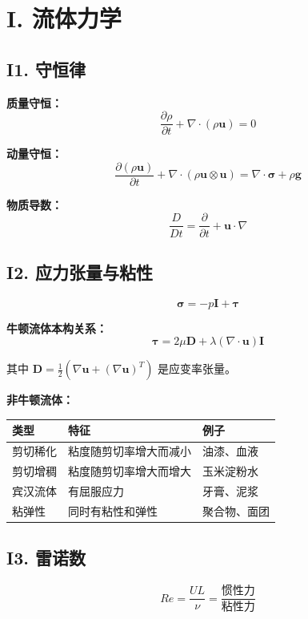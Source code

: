 \section{I. 流体力学}

\subsection{I1. 守恒律}

\textbf{质量守恒：}
\[
\frac{\partial \rho}{\partial t} + \nabla \cdot (\rho \mathbf{u}) = 0
\]

\textbf{动量守恒：}
\[
\frac{\partial(\rho \mathbf{u})}{\partial t} + \nabla \cdot (\rho \mathbf{u} \otimes \mathbf{u}) = \nabla \cdot \boldsymbol{\sigma} + \rho \mathbf{g}
\]

\textbf{物质导数：}
\[
\frac{D}{Dt} = \frac{\partial}{\partial t} + \mathbf{u} \cdot \nabla
\]

\subsection{I2. 应力张量与粘性}

\[
\boldsymbol{\sigma} = -p\mathbf{I} + \boldsymbol{\tau}
\]

\textbf{牛顿流体本构关系：}
\[
\boldsymbol{\tau} = 2\mu\mathbf{D} + \lambda(\nabla\cdot\mathbf{u})\mathbf{I}
\]

其中 $\mathbf{D} = \frac{1}{2}(\nabla\mathbf{u} + (\nabla\mathbf{u})^T)$ 是应变率张量。

\textbf{非牛顿流体：}
\begin{center}
\begin{tabular}{lll}
\toprule
\textbf{类型} & \textbf{特征} & \textbf{例子} \\
\midrule
剪切稀化 & 粘度随剪切率增大而减小 & 油漆、血液 \\
剪切增稠 & 粘度随剪切率增大而增大 & 玉米淀粉水 \\
宾汉流体 & 有屈服应力 & 牙膏、泥浆 \\
粘弹性 & 同时有粘性和弹性 & 聚合物、面团 \\
\bottomrule
\end{tabular}
\end{center}

\subsection{I3. 雷诺数}

\[
Re = \frac{UL}{\nu} = \frac{\text{惯性力}}{\text{粘性力}}
\]

